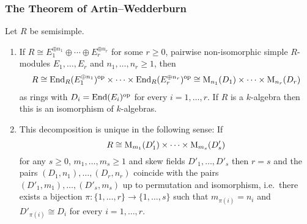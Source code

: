 \subsubsection{The Theorem of Artin--Wedderburn}


\begin{theorem}
  \label{theorem: artin wedderburn theorem}
  Let $R$ be semisimple.
  \begin{enumerate}
    \item
      If $R \cong E_1^{\oplus n_1} \oplus \dotsb \oplus E_r^{\oplus n_r}$ for some $r \geq 0$, pairwise non-isomorphic simple $R$-modules $E_1, \dotsc, E_r$ and $n_1, \dotsc, n_r \geq 1$, then
      \begin{align*}
              R
        \cong \operatorname{End}_R(E_1^{\oplus n_1})^{\operatorname{op}} \times \dotsb \times \operatorname{End}_R(E_r^{\oplus n_r})^{\operatorname{op}}
        \cong \operatorname{M}_{n_1}(D_1) \times \dotsb \times  \operatorname{M}_{n_r}(D_r)
      \end{align*}
      as rings with $D_i = \operatorname{End}(E_i)^{\operatorname{op}}$ for every $i = 1, \dotsc, r$.
      If $R$ is a $k$-algebra then this is an isomorphism of $k$-algebras.
    \item
      This decomposition is unique in the following sense:
      If
      \[
              R
        \cong \operatorname{M}_{m_1}(D'_1) \times \dotsb \times \operatorname{M}_{m_s}(D'_s)
      \]
      for any $s \geq 0$, $m_1, \dotsc, m_s \geq 1$ and skew fields $D'_1, \dotsc, D'_s$ then $r = s$ and the pairs $(D_1, n_1), \dotsc, (D_r, n_r)$ coincide with the pairs $(D'_1, m_1), \dotsc, (D'_s, m_s)$ up to permutation and isomorphism, i.e.\ there exists a bijection $\pi \colon \{1, \dotsc, r\} \to \{1, \dotsc, s\}$ such that $m_{\pi(i)} = n_i$ and $D'_{\pi(i)} \cong D_i$ for every $i = 1, \dotsc, r$.
  \end{enumerate}
\end{theorem}



